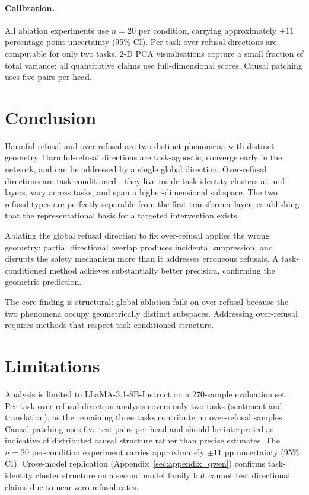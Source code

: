 \documentclass[11pt]{article}
\begin{document}
\paragraph{Calibration.}
All ablation experiments use $n=20$ per condition, carrying approximately
$\pm 11$ percentage-point uncertainty (95\% CI).
Per-task over-refusal directions are computable for only two tasks.
2-D PCA visualisations capture a small fraction of total variance; all
quantitative claims use full-dimensional scores.
Causal patching uses five pairs per head.

\section{Conclusion}

Harmful refusal and over-refusal are two distinct phenomena with distinct
geometry.
Harmful-refusal directions are task-agnostic, converge early in the network,
and can be addressed by a single global direction.
Over-refusal directions are task-conditioned---they live inside task-identity
clusters at mid-layers, vary across tasks, and span a higher-dimensional
subspace.
The two refusal types are perfectly separable from the first transformer
layer, establishing that the representational basis for a targeted
intervention exists.

Ablating the global refusal direction to fix over-refusal applies the wrong
geometry: partial directional overlap produces incidental suppression, and
disrupts the safety mechanism more than it addresses erroneous refusals.
A task-conditioned method achieves substantially better precision,
confirming the geometric prediction.

The core finding is structural: global ablation fails on over-refusal
because the two phenomena occupy geometrically distinct subspaces.
Addressing over-refusal requires methods that respect task-conditioned
structure.

\section*{Limitations}

Analysis is limited to LLaMA-3.1-8B-Instruct on a 270-sample evaluation set.
Per-task over-refusal direction analysis covers only two tasks (sentiment
and translation), as the remaining three tasks contribute no over-refusal
samples.
Causal patching uses five test pairs per head and should be interpreted as
indicative of distributed causal structure rather than precise estimates.
The $n=20$ per-condition experiment carries approximately $\pm 11$ pp
uncertainty (95\% CI).
Cross-model replication (Appendix~\ref{sec:appendix_qwen}) confirms
task-identity cluster structure on a second model family but cannot test
directional claims due to near-zero refusal rates.
\end{document}
